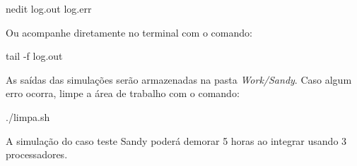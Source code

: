 \begin{bashcode}
nedit log.out log.err
\end{bashcode}
\bigskip

\noindent Ou acompanhe diretamente no terminal com o comando:
\bigskip

\begin{bashcode}
tail -f log.out
\end{bashcode}
\bigskip

\noindent As saídas das simulações serão armazenadas na pasta \textit{Work/Sandy}. Caso algum erro ocorra, limpe a área de trabalho com o comando:
\bigskip

\begin{bashcode}
./limpa.sh
\end{bashcode}
\bigskip


\begin{tcolorbox}[enhanced,
  grow to left by=0cm,%
  grow to right by=0cm,%
  enlarge top by=0cm,%
  enlarge bottom by=0cm,%
  tcbox raise base,
  boxrule=1.0pt,
  left=18mm,
  colframe=red!50!black,coltext=red!25!black,colback=red!10!white,
  overlay={\begin{tcbclipinterior}\fill[red!75!blue!50!white] (frame.south west)
    rectangle node[text=white,font=\sffamily\bfseries\footnotesize,rotate=0] {ATENÇÃO} ([xshift=18mm]frame.north west);\end{tcbclipinterior}}]
A simulação do caso teste Sandy poderá demorar 5 horas ao integrar usando 3 processadores.
\end{tcolorbox}
\bigskip
